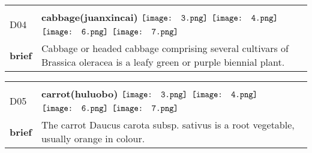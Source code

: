 \documentclass[UTF8]{article}
\begin{document}
            \begin{tabularx}{\textwidth}{p{1.5cm}X}
            \arrayrulecolor{myBlue}
        	\hline\\
            \small{D04}&
            \large{\bfseries{cabbage(juanxincai)}}\hfill
                                                \phantom{$\vcenter{\hbox{\texttt{[image: 1.png]}}}$}
                                                                \phantom{$\vcenter{\hbox{\texttt{[image: 2.png]}}}$}
                                                                $\vcenter{\hbox{\texttt{[image: 3.png]}}}$
                                                                $\vcenter{\hbox{\texttt{[image: 4.png]}}}$
                                                                \phantom{$\vcenter{\hbox{\texttt{[image: 5.png]}}}$}
                                                                $\vcenter{\hbox{\texttt{[image: 6.png]}}}$
                                                                $\vcenter{\hbox{\texttt{[image: 7.png]}}}$
                                        \\[10pt]
            \large{\bfseries{brief}}&\noindent\parbox[c]{\hsize}{Cabbage or headed cabbage comprising several cultivars of Brassica oleracea is a leafy green or purple biennial plant. } \\[5pt]
            \hline\\[-10pt]
        \end{tabularx}
            \begin{tabularx}{\textwidth}{p{1.5cm}X}
            \arrayrulecolor{myBlue}
        	\hline\\
            \small{D05}&
            \large{\bfseries{carrot(huluobo)}}\hfill
                                                \phantom{$\vcenter{\hbox{\texttt{[image: 1.png]}}}$}
                                                                \phantom{$\vcenter{\hbox{\texttt{[image: 2.png]}}}$}
                                                                $\vcenter{\hbox{\texttt{[image: 3.png]}}}$
                                                                $\vcenter{\hbox{\texttt{[image: 4.png]}}}$
                                                                \phantom{$\vcenter{\hbox{\texttt{[image: 5.png]}}}$}
                                                                $\vcenter{\hbox{\texttt{[image: 6.png]}}}$
                                                                $\vcenter{\hbox{\texttt{[image: 7.png]}}}$
                                        \\[10pt]
            \large{\bfseries{brief}}&\noindent\parbox[c]{\hsize}{The carrot Daucus carota subsp. sativus is a root vegetable, usually orange in colour. } \\[5pt]
            \hline\\[-10pt]
        \end{tabularx}
\end{document}
